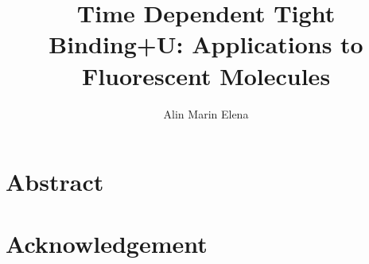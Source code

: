 \documentclass[twoside,a4paper,12pt]{aprilthesis}
\title{Time Dependent Tight Binding+U: Applications to Fluorescent Molecules}
\author{Alin Marin Elena}
\affiliation{The Queen's University of Belfast}
\begin{document}
\pagestyle{empty}
\frontmatter
\maketitle
%
%
%
\chapter{Abstract}

%
\chapter{Acknowledgement}

%
\setcounter{tocdepth}{1}
\tableofcontents
%
\glsaddall
\renewcommand{\glossaryname}{Glossary of Symbols}
\printglossaries
\mainmatter
\pagestyle{fancy}





\end{document}

